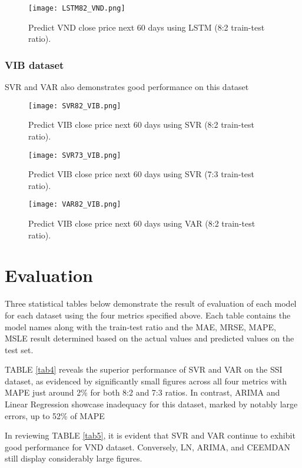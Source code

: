 \documentclass{ieeeojies}
\begin{document}
\begin{figure}[H]
	\centering
	\texttt{[image: LSTM82\_VND.png]}
	\caption{Predict VND close price next 60 days using LSTM (8:2 train-test ratio).\centering}
	\label{fig1}
\end{figure}

\subsubsection{\textbf{VIB dataset}}
SVR and VAR also demonstrates good performance on this dataset
\begin{figure}[H]
	\centering
	\texttt{[image: SVR82\_VIB.png]}
	\caption{Predict VIB close price next 60 days using SVR (8:2 train-test ratio).\centering}
	\label{fig1}
\end{figure}
\begin{figure}[H]
	\centering	\texttt{[image: SVR73\_VIB.png]}
	\caption{Predict VIB close price next 60 days using SVR (7:3 train-test ratio).\centering}
	\label{fig1}
\end{figure}
\begin{figure}[H]
	\centering	\texttt{[image: VAR82\_VIB.png]}
	\caption{Predict VIB close price next 60 days using VAR (8:2 train-test ratio).\centering}
	\label{fig1}
\end{figure}

\section{Evaluation}
Three statistical tables below demonstrate the result of evaluation of each model for each dataset using the four metrics specified above. Each table contains the model names along with the train-test ratio and the MAE, MRSE, MAPE, MSLE result determined based on the actual values and predicted values on the test set.

\noindent TABLE \ref{tab4} reveals the superior performance of SVR and VAR on the SSI dataset, as evidenced by significantly small figures across all four metrics with MAPE just around 2\% for both 8:2 and 7:3 ratios. In contrast, ARIMA and Linear Regression showcase inadequacy for this dataset, marked by notably large errors, up to 52\% of MAPE

\noindent In reviewing TABLE \ref{tab5}, it is evident that SVR and VAR continue to exhibit good performance for VND dataset. Conversely, LN, ARIMA, and CEEMDAN still display considerably large figures.
\end{document}
